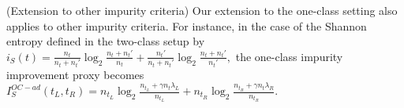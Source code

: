 \begin{remark}({\sc Extension to other impurity criteria})
Our extension to the one-class setting also applies to other impurity criteria. For instance, in the case of the Shannon entropy defined in the two-class setup by
$i_S(t) = \frac{n_t}{n_t + n_t'} \log_2 \frac{n_t + n_t'}{n_t} + \frac{n_t'}{n_t + n_t'} \log_2 \frac{n_t + n_t'}{n_t'},$
the one-class impurity improvement proxy becomes
$I_S^{OC-ad}(t_L, t_R) = n_{t_L} \log_2 \frac{n_{t_L} + \gamma n_t \lambda_L}{n_{t_L}} + n_{t_R} \log_2 \frac{n_{t_R} + \gamma n_t \lambda_R}{n_{t_R}}.$
\end{remark}








